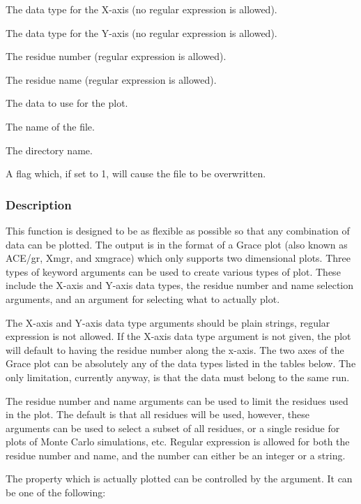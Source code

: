   The data type for the X-axis (no regular expression is allowed).

  The data type for the Y-axis (no regular expression is allowed).

  The residue number (regular expression is allowed).

  The residue name (regular expression is allowed).

  The data to use for the plot.

  The name of the file.

  The directory name.

  A flag which, if set to 1, will cause the file to be overwritten.

\subsubsection{Description}

This function is designed to be as flexible as possible so that any combination of data can
be plotted.  The output is in the format of a Grace plot (also known as ACE/gr, Xmgr, and
xmgrace) which only supports two dimensional plots.  Three types of keyword arguments can
be used to create various types of plot.  These include the X-axis and Y-axis data types,
the residue number and name selection arguments, and an argument for selecting what to
actually plot.

The X-axis and Y-axis data type arguments should be plain strings, regular expression is not
allowed.  If the X-axis data type argument is not given, the plot will default to having the
residue number along the x-axis.  The two axes of the Grace plot can be absolutely any of
the data types listed in the tables below.  The only limitation, currently anyway, is that
the data must belong to the same run.

The residue number and name arguments can be used to limit the residues used in the plot.
The default is that all residues will be used, however, these arguments can be used to
select a subset of all residues, or a single residue for plots of Monte Carlo simulations,
etc.  Regular expression is allowed for both the residue number and name, and the number can
either be an integer or a string.

The property which is actually plotted can be controlled by the 
 argument.  It
can be one of the following:
    

